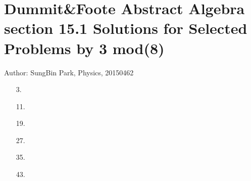 \documentclass[12pt]{article}
\begin{document}
\section*{Dummit\&Foote Abstract Algebra section 15.1 Solutions for Selected Problems by 3 mod(8)}
Author: SungBin Park, Physics, 20150462
\begin{enumerate}
\item[3.]
\item[11.]
\item[19.]
\item[27.]
\item[35.]
\item[43.]
\end{enumerate}
\end{document}
